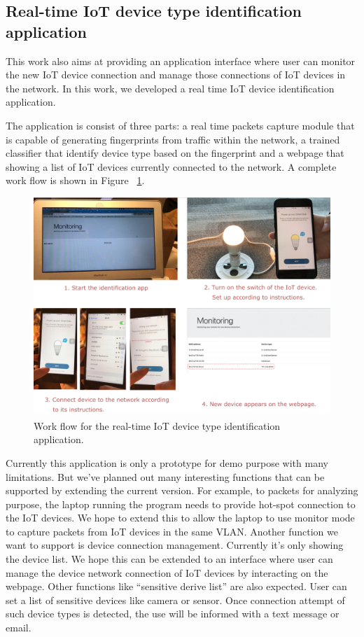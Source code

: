 \documentclass[twocolumn,10pt]{article}
\begin{document}
\subsection{Real-time IoT device type identification application}

This work also aims at providing an application interface where user can monitor the new IoT device connection and manage those connections of IoT devices in the network. In this work, we developed a real time IoT device identification application. 

The application is consist of three parts:  a real time packets capture module that is capable of generating fingerprints from traffic within the network, a trained classifier that identify device type based on the fingerprint and a webpage that showing a list of IoT devices currently connected to the network. A complete work flow is shown in Figure ~\ref{fig: demo}.

\begin{figure}[h]
  \centering
   \includegraphics[scale=0.29]{demo}
  \caption[Work flow for the real-time IoT device type identification application]{Work flow for the real-time IoT device type identification application.}
  \label{fig: demo}
\end{figure}

Currently this application is only a prototype for demo purpose with many limitations. But we’ve planned out many interesting functions that can be supported by extending the current version. For example, to packets for analyzing purpose, the laptop running the program needs to provide hot-spot connection to the IoT devices. We hope to extend this to allow the laptop to use monitor mode to capture packets from IoT devices in the same VLAN. Another function we want to support is device connection management. Currently it’s only showing the device list. We hope this can be extended to an interface where user can manage the device network connection of IoT devices by interacting on the webpage. Other functions like “sensitive derive list” are also expected. User can set a list of sensitive devices like camera or sensor. Once connection attempt of such device types is detected, the use will be informed with a text message or email. 
\end{document}
